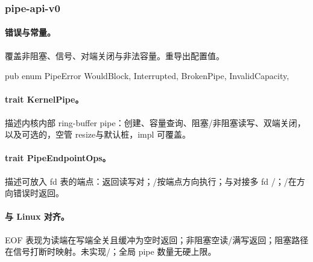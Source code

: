 
\subsubsection{pipe-api-v0}

\paragraph{错误与常量。}
覆盖非阻塞、信号、对端关闭与非法容量。重导出配置值。

\begin{rustcode}
pub enum PipeError {
    WouldBlock,
    Interrupted,
    BrokenPipe,
    InvalidCapacity,
}
\end{rustcode}

\paragraph{trait KernelPipe。}
描述内核内部 ring-buffer pipe：创建、容量查询、阻塞/非阻塞读写、双端关闭，以及可选的，空管 resize与默认桩，impl 可覆盖。

\paragraph{trait PipeEndpointOps。}
描述可放入 fd 表的端点：返回读写对；/按端点方向执行；与对接多 fd /；/在方向错误时返回。

\paragraph{与 Linux 对齐。}
EOF 表现为读端在写端全关且缓冲为空时返回；非阻塞空读/满写返回；阻塞路径在信号打断时映射。未实现/；全局 pipe 数量无硬上限。
